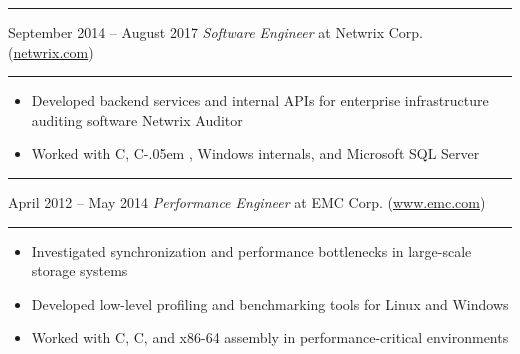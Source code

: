\documentclass[12pt]{article}
\newcommand\CXX{C\nolinebreak[4]\hspace{-.05em}\raisebox{.4ex}{\relsize{-3}{\textbf{++}}}}
\newcommand{\Csharp}{%
  {\settoheight{\dimen0}{C}C\kern-.05em \resizebox{!}{\dimen0}{\raisebox{\depth}{\#}}}}
\newcommand\CvSmallSkipLength{0.5em}
\newcommand\CvBigSkipLength{1em}
\newcommand\CvSkip[1]{\vspace{#1}}
\newcommand\CvSmallSkip{\CvSkip{\CvSmallSkipLength}}
\newcommand\CvBigSkip{\CvSkip{\CvBigSkipLength}}
\newcommand\CvSectionHeader[1]{\CvBigSkip\textbf{#1}\CvBigSkip}
\newcommand\CvRule{\begingroup\color{CvRuleColor}\hrule\endgroup}
\newcommand\CvWorkplaceHeader[5]{\begingroup%
  \CvRule\nopagebreak%
  \fboxsep0pt%
  \colorbox{CvWorkplaceHeaderColor}{%
    \begin{minipage}{\linewidth-2\fboxsep}%
\CvSmallSkip%
#1 -- #2 \hfill \textit{#3} at #4 (\href{http://#5/}{#5})%
\CvSmallSkip%
    \end{minipage}%
  }%
  \CvRule%
\endgroup%
}
\newenvironment{CvWorkplaceDescription}{%
    \begingroup\setlength\parskip{\CvSmallSkipLength}%
  }{%
    \CvSmallSkip\endgroup%
  }
\begin{document}
\CvWorkplaceHeader{September 2014}{August 2017}{Software Engineer}{Netwrix Corp.}{netwrix.com}

\begin{CvWorkplaceDescription}
\begin{itemize}[noitemsep]
  \item Developed backend services and internal APIs for enterprise infrastructure auditing software Netwrix Auditor
  \item Worked with \CXX, \Csharp, Windows internals, and Microsoft SQL Server
\end{itemize}
\end{CvWorkplaceDescription}

\CvWorkplaceHeader{April 2012}{May 2014}{Performance Engineer}{EMC Corp.}{www.emc.com}

\begin{CvWorkplaceDescription}
\begin{itemize}[noitemsep]
  \item Investigated synchronization and performance bottlenecks in large-scale storage systems
  \item Developed low-level profiling and benchmarking tools for Linux and Windows
  \item Worked with \CXX, C, and x86-64 assembly in performance-critical environments
\end{itemize}
\end{CvWorkplaceDescription}

\end{document}
